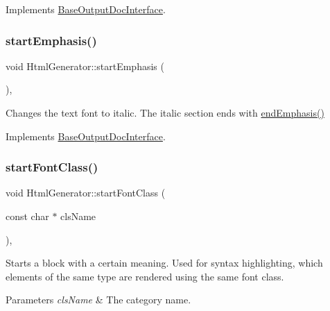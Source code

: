 Implements \mbox{\hyperlink{class_base_output_doc_interface_ac9c801c3ad0b50e3e69be184b50c2fef}{Base\+Output\+Doc\+Interface}}.

\mbox{\label{class_html_generator_afa50b0bc75a1f73eb0e86d4718534d1b}} 
\subsubsection{\texorpdfstring{startEmphasis()}{startEmphasis()}}
{\footnotesize\ttfamily void Html\+Generator\+::start\+Emphasis (\begin{DoxyParamCaption}{ }\end{DoxyParamCaption})\hspace{0.3cm}{\ttfamily [inline]}, {\ttfamily [virtual]}}

Changes the text font to italic. The italic section ends with \mbox{\hyperlink{class_html_generator_a88c2f4c34f00161d34e4c1059d747381}{end\+Emphasis()}} 

Implements \mbox{\hyperlink{class_base_output_doc_interface_a21debc3a6c4c58791a41e715dc78f4ab}{Base\+Output\+Doc\+Interface}}.

\mbox{\label{class_html_generator_aa600cc24896060a68612e3db6efb7dbf}} 
\subsubsection{\texorpdfstring{startFontClass()}{startFontClass()}}
{\footnotesize\ttfamily void Html\+Generator\+::start\+Font\+Class (\begin{DoxyParamCaption}\item[{const char $\ast$}]{cls\+Name }\end{DoxyParamCaption})\hspace{0.3cm}{\ttfamily [inline]}, {\ttfamily [virtual]}}

Starts a block with a certain meaning. Used for syntax highlighting, which elements of the same type are rendered using the same \textquotesingle{}font class\textquotesingle{}. 
\begin{DoxyParams}{Parameters}
{\em cls\+Name} & The category name. \\
\hline
\end{DoxyParams}


